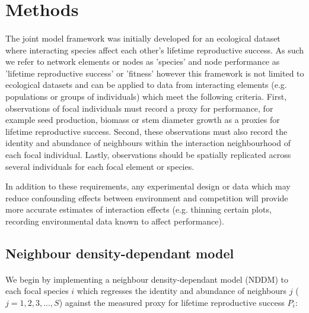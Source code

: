 \documentclass[a4,12pt]{article}
\begin{document}
\section{Methods}

    
    \paragraph{}
    The joint model framework was initially developed for an ecological dataset where interacting species affect each other's lifetime reproductive success. As such we refer to network elements or nodes as 'species' and node performance as 'lifetime reproductive success' or 'fitness' however this framework is not limited to ecological datasets and can be applied to data from interacting elements (e.g. populations or groups of individuals) which meet the following criteria. First,   observations of focal individuals must record a proxy for performance, for example seed production, biomass or stem diameter growth as a proxies for lifetime reproductive success. Second,  these observations must also record the identity and abundance of neighbours within the interaction neighbourhood of each focal individual. Lastly, observations should be spatially replicated across several individuals for each focal element or species.


    In addition to these requirements, any experimental design or data which may reduce confounding effects between environment and competition will provide more accurate estimates of interaction effects (e.g. thinning certain plots, recording environmental data known to affect performance). 
    
    \subsection{Neighbour density-dependant model}
        
        \paragraph{}
        We begin by implementing a neighbour density-dependant model (NDDM) to each focal species $i$ which regresses the identity and abundance of neighbours $j$ ($j = 1, 2, 3, ..., S$) against the measured proxy for lifetime reproductive success $P_{i}$:
        
\end{document}
